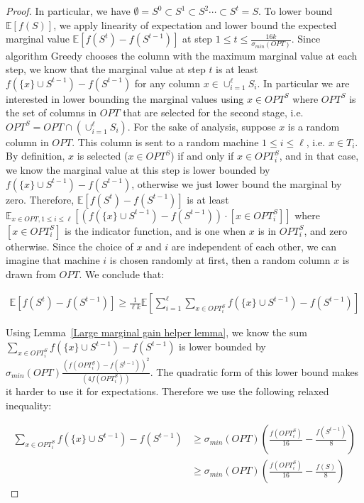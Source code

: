 \documentclass{article}
\newcommand{\E}{\mathbb{E}}
\begin{document}
\begin{proof}
In particular, we have $\emptyset = S^0 \subset S^1 \subset S^2 \cdots \subset S^t = S$.
To lower bound $\E[f(S)]$, we apply linearity of expectation and lower bound the expected marginal value $\E[f(S^t) - f(S^{t-1})]$ at step $1 \leq t \leq \frac{16k}{\sigma_{min}(OPT)}$.
Since algorithm Greedy chooses the column with the maximum marginal value at each step, we know that the marginal value at step $t$ is at least $f(\{x\} \cup S^{t-1}) - f(S^{t-1})$ for any column $x \in \cup_{i=1}^{\ell} S_i$.
In particular we are interested in lower bounding the marginal values using $x \in OPT^S$ where $OPT^S$ is the set of columns in $OPT$ that are selected for the second stage, i.e. $OPT^S = OPT \cap (\cup_{i=1}^{\ell} S_i)$. For the sake of analysis, suppose $x$ is a random column in $OPT$.
This column is sent to a random machine $1 \leq i \leq \ell$, i.e. $x \in T_i$.
By definition, $x$ is selected ($x \in OPT^S$) if and only if $x \in OPT_i^{S}$, and in that case, we know the marginal value at this step is lower bounded by  $f(\{x\} \cup S^{t-1}) - f(S^{t-1})$, 
otherwise we just lower bound the marginal by zero.
Therefore, $\E[f(S^t) - f(S^{t-1})]$ is at least $\E_{x \in OPT, 1 \leq i \leq \ell}[(f(\{x\} \cup S^{t-1}) - f(S^{t-1})) \cdot
[x \in OPT_i^S]]$ where $[x \in OPT_i^S]$ is the indicator function, and is one when $x$ is in $OPT_i^S$, and zero otherwise. Since the choice of $x$ and $i$ are independent of each other, we can imagine that machine $i$ is chosen randomly at first, then a random column $x$ is drawn from $OPT$. We conclude that: 

\begin{align}\label{eq:marginal-1}
\E[f(S^t) - f(S^{t-1})] \geq \frac{1}{\ell k}\E[\sum_{i=1}^{\ell} \sum_{x \in OPT_i^S} f(\{x\} \cup S^{t-1}) - f(S^{t-1})]
\end{align}

Using Lemma~\ref{Large marginal gain helper lemma}, we know the sum $\sum_{x \in OPT_i^S} f(\{x\} \cup S^{t-1}) - f(S^{t-1})$ is lower bounded by $\sigma_{min}(OPT) \frac{(f(OPT_i^S) - f(S^{t-1}))^2} {(4f(OPT_i^S))}$. The quadratic form of this lower bound makes it harder to use it for expectations. Therefore we use the following relaxed inequality:

\begin{align}
\sum_{x \in OPT_i^S} f(\{x\} \cup S^{t-1}) - f(S^{t-1})
& \geq \sigma_{min}(OPT) (\frac{f(OPT_i^S)}{16} - \frac{f(S^{t-1})}{8}) \label{eq:marginal-2}
\\ &\geq \sigma_{min}(OPT) (\frac{f(OPT_i^S)}{16} - \frac{f(S)}{8}) \label{eq:marginal-3}
\end{align}


\end{proof}
\end{document}
